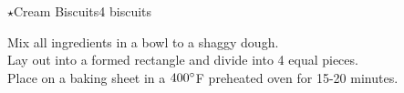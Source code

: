 \begin{recipe}{\texorpdfstring{$\star$}{str}Cream Biscuits}{4 biscuits}{}


    Mix all ingredients in a bowl to a shaggy dough.\\

    Lay out into a formed rectangle and divide into 4 equal pieces.\\

    Place on a baking sheet in a $400\degree$F preheated oven for 15-20 minutes.
\end{recipe}